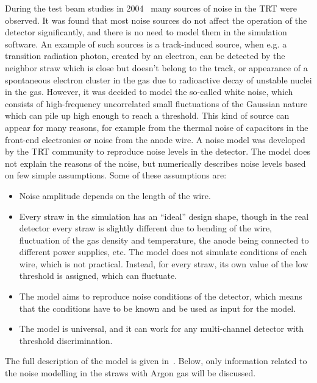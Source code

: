 During the test beam studies in 2004~\cite{trt_test_beam} many sources of noise in the TRT were observed.
It was found that most noise sources do not affect the operation of the detector significantly, and there is no need to model them in the simulation software.
An example of such sources is a track-induced source, when e.g. a transition radiation photon, created by an electron, can be detected by the neighbor straw which is close 
but doesn't belong to the track, or appearance of a spontaneous electron cluster in the gas due to radioactive decay of unstable nuclei in the gas.
However, it was decided to model the so-called white noise, which consists of high-frequency uncorrelated small fluctuations of the Gaussian nature which can pile up high enough to reach a threshold. This kind of source can appear for many reasons, for example from the thermal noise of capacitors in the front-end electronics
or noise from the anode wire. A noise model was developed by the TRT community to reproduce noise levels in the detector.
The model does not explain the reasons of the noise, but numerically describes noise levels based on few simple assumptions.
Some of these assumptions are:
\begin{itemize}
 \item Noise amplitude depends on the length of the wire.
 \item Every straw in the simulation has an ``ideal'' design shape, though in the real detector every straw is slightly different due to bending of the wire, 
 fluctuation of the gas density and temperature, the anode being connected to different power supplies, etc. The model does not simulate conditions of each wire, 
 which is not practical. 
 Instead, for every straw, its own value of the low threshold is assigned, which can fluctuate.
 \item The model aims to reproduce noise conditions of the detector, which means that the conditions have to be known and be used as input for the model.
 \item The model is universal, and it can work for any multi-channel detector with threshold discrimination.
\end{itemize}
The full description of the model is given in~\cite{kittelmann_thesis}. 
Below, only information related to the noise modelling in the straws with Argon gas will be discussed.

